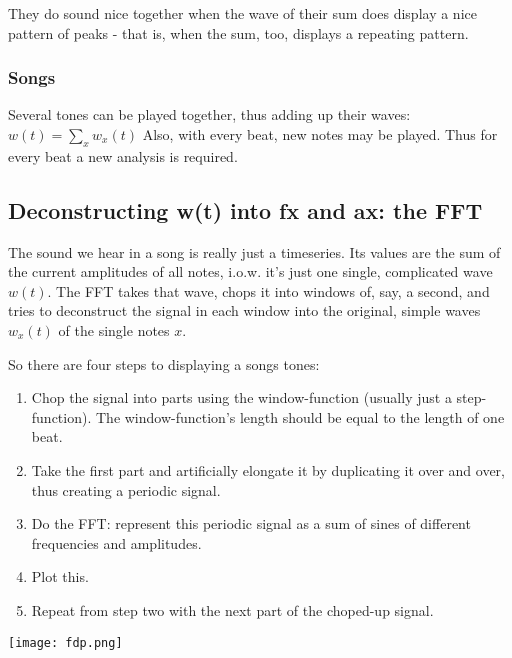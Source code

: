 They do sound nice together when the wave of their sum does display a nice pattern of peaks - that is, when the sum, too, displays a repeating pattern.

\subsubsection{Songs}

Several tones can be played together, thus adding up their waves: $w(t) = \sum_x w_x(t)$ Also, with every beat, new notes may be played. Thus for every beat a new analysis is required. 

\subsection{Deconstructing w(t) into fx and ax: the FFT}

The sound we hear in a song is really just a timeseries. Its values are the sum of the current amplitudes of all notes, i.o.w. it's just one single, complicated wave $w(t)$. The FFT takes that wave, chops it into windows of, say, a second, and tries to deconstruct the signal in each window into the original, simple waves $w_x(t)$ of the single notes $x$. 

So there are four steps to displaying a songs tones:

\begin{enumerate}
    \item Chop the signal into parts using the window-function (usually just a step-function). The window-function's length should be equal to the length of one beat.
    \item Take the first part and artificially elongate it by duplicating it over and over, thus creating a periodic signal.
    \item Do the FFT: represent this periodic signal as a sum of sines of different frequencies and amplitudes.
    \item Plot this.
    \item Repeat from step two with the next part of the choped-up signal.
\end{enumerate}

\texttt{[image: fdp.png]}